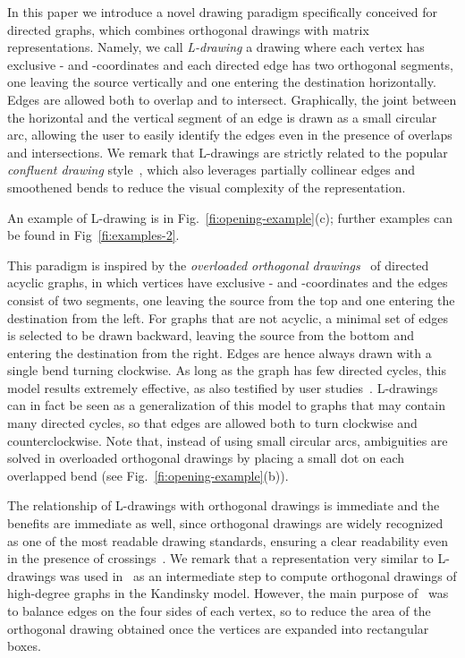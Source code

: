 \documentclass{llncs}
\begin{document}
In this paper we introduce a novel drawing paradigm specifically conceived for directed graphs, which combines orthogonal drawings with matrix representations. Na\-me\-ly, we call \emph{L-drawing} a drawing where each vertex has exclusive - and -coordinates and each directed edge has two orthogonal segments, one leaving the source vertically and one entering the destination horizontally. Edges are allowed both to overlap and to intersect. Graphically, the joint between the horizontal and the vertical segment of an edge is drawn as a small circular arc, allowing the user to easily identify the edges even in the presence of overlaps and intersections. We remark that L-drawings are strictly related to the popular {\em confluent drawing} style~\cite{degm-cd-05}, which also leverages partially collinear edges and smoothened bends to reduce the visual complexity of the representation.

An example of L-drawing is in Fig.~\ref{fi:opening-example}(c); further examples can be found in Fig~\ref{fi:examples-2}.

This paradigm is inspired by the \emph{overloaded orthogonal drawings}~\cite{kt-ood-11,kt-davlg-12} of directed acyclic graphs, in which vertices have exclusive - and -coordinates and the edges consist of two segments, one leaving the source from the top and one entering the destination from the left. For graphs that are not acyclic, a minimal set of edges is selected to be drawn backward, leaving the source from the bottom and entering the destination from the right. Edges are hence always drawn with a single bend turning clockwise. As long as the graph has few directed cycles, this model results extremely effective, as also testified by user studies~\cite{dmpt-hvdgu-14}. L-drawings can in fact be seen as a generalization of this model to graphs that may contain many directed cycles, so that edges are allowed both to turn clockwise and counterclockwise. Note that, instead of using small circular arcs, ambiguities are solved in overloaded orthogonal drawings by placing a small dot on each overlapped bend (see Fig.~\ref{fi:opening-example}(b)). 

The relationship of L-drawings with orthogonal drawings is immediate and the benefits are immediate as well, since orthogonal drawings are widely recognized as one of the most readable drawing standards, ensuring a clear readability even in the presence of crossings~\cite{dett-gd-99,hhe-eca-08}.
We remark that a representation very similar to L-drawings was used in~\cite{bk-aesig-97} as an intermediate step to compute orthogonal drawings of high-degree graphs in the Kandinsky model. However, the main purpose of~\cite{bk-aesig-97} was to balance edges on the four sides of each vertex, so to reduce the area of the orthogonal drawing obtained once the vertices are expanded into rectangular boxes.
\end{document}
